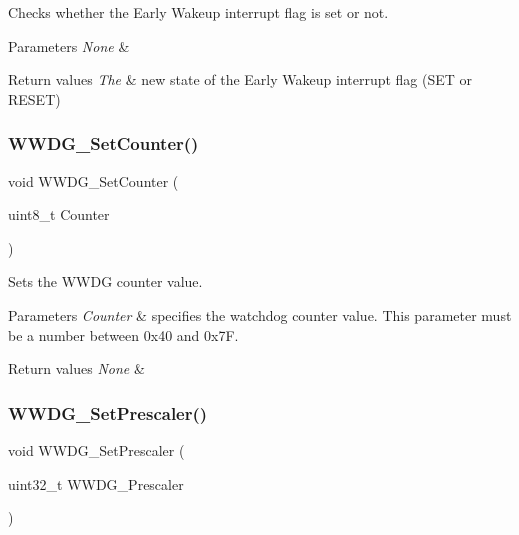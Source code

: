 Checks whether the Early Wakeup interrupt flag is set or not. 


\begin{DoxyParams}{Parameters}
{\em None} & \\
\hline
\end{DoxyParams}

\begin{DoxyRetVals}{Return values}
{\em The} & new state of the Early Wakeup interrupt flag (S\+ET or R\+E\+S\+ET) \\
\hline
\end{DoxyRetVals}
\mbox{\label{group___w_w_d_g___exported___functions_ga6e44cc35f133b28b9ad861f459bf8d76}} 
\subsubsection{\texorpdfstring{WWDG\_SetCounter()}{WWDG\_SetCounter()}}
{\footnotesize\ttfamily void W\+W\+D\+G\+\_\+\+Set\+Counter (\begin{DoxyParamCaption}\item[{uint8\+\_\+t}]{Counter }\end{DoxyParamCaption})}



Sets the W\+W\+DG counter value. 


\begin{DoxyParams}{Parameters}
{\em Counter} & specifies the watchdog counter value. This parameter must be a number between 0x40 and 0x7F. \\
\hline
\end{DoxyParams}

\begin{DoxyRetVals}{Return values}
{\em None} & \\
\hline
\end{DoxyRetVals}
\mbox{\label{group___w_w_d_g___exported___functions_gafeaa2b52c31ba7baca7eb61d2d42e07b}} 
\subsubsection{\texorpdfstring{WWDG\_SetPrescaler()}{WWDG\_SetPrescaler()}}
{\footnotesize\ttfamily void W\+W\+D\+G\+\_\+\+Set\+Prescaler (\begin{DoxyParamCaption}\item[{uint32\+\_\+t}]{W\+W\+D\+G\+\_\+\+Prescaler }\end{DoxyParamCaption})}



